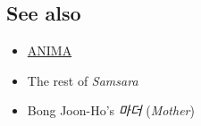 \hypertarget{see-also}{%
\subsection{See also}\label{see-also}}

\begin{itemize}
\tightlist
\item
  \href{https://www.netflix.com/title/81110498}{ANIMA}
\item
  The rest of \emph{Samsara}
\item
  Bong Joon-Ho's \emph{마더} (\emph{Mother})
\end{itemize}
